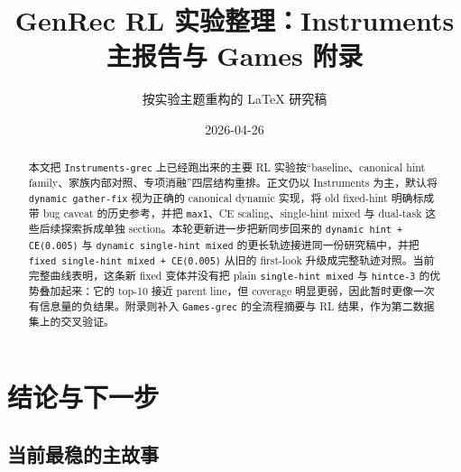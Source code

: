 \documentclass[11pt,a4paper]{ctexart}
\title{GenRec RL 实验整理：Instruments 主报告与 Games 附录}
\author{按实验主题重构的 LaTeX 研究稿}
\date{2026-04-26}
\begin{document}
\maketitle

\begin{abstract}
本文把 \texttt{Instruments-grec} 上已经跑出来的主要 RL 实验按“baseline、canonical hint family、家族内部对照、专项消融”四层结构重排。正文仍以 Instruments 为主，默认将 \texttt{dynamic gather-fix} 视为正确的 canonical dynamic 实现，将 old fixed-hint 明确标成带 bug caveat 的历史参考，并把 \texttt{max1}、CE scaling、single-hint mixed 与 dual-task 这些后续探索拆成单独 section。本轮更新进一步把新同步回来的 \texttt{dynamic hint + CE(0.005)} 与 \texttt{dynamic single-hint mixed} 的更长轨迹接进同一份研究稿中，并把 \texttt{fixed single-hint mixed + CE(0.005)} 从旧的 first-look 升级成完整轨迹对照。当前完整曲线表明，这条新 fixed 变体并没有把 plain \texttt{single-hint mixed} 与 \texttt{hintce-3} 的优势叠加起来：它的 top-10 接近 parent line，但 coverage 明显更弱，因此暂时更像一次有信息量的负结果。附录则补入 \texttt{Games-grec} 的全流程摘要与 RL 结果，作为第二数据集上的交叉验证。
\end{abstract}

\tableofcontents
\newpage















\section{结论与下一步}

\subsection{当前最稳的主故事}
\end{document}
